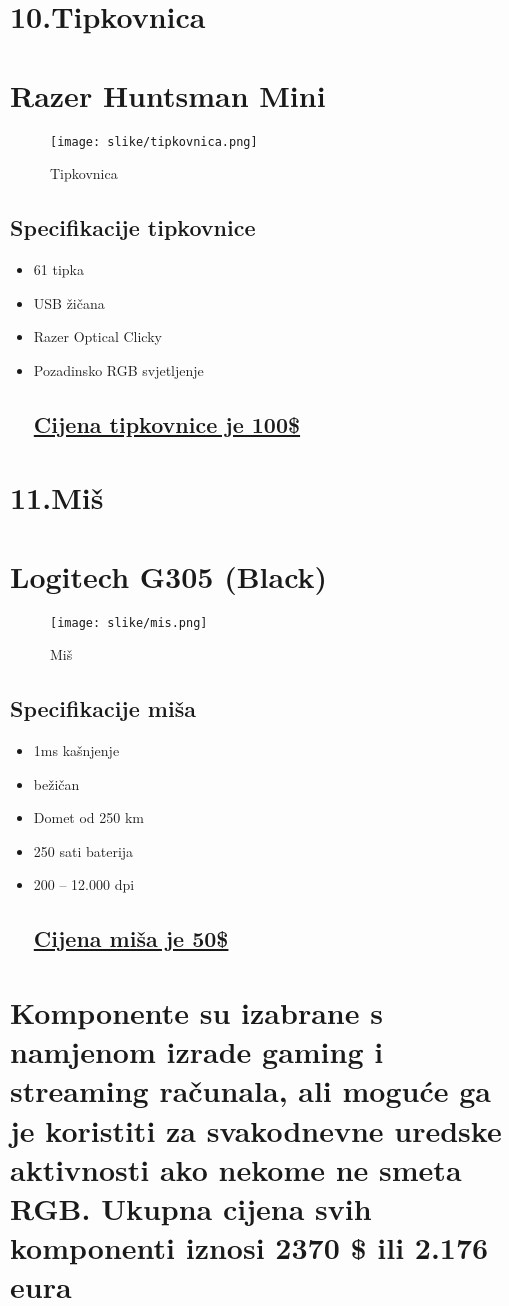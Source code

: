 \documentclass[12pt]{article}
\begin{document}
\newpage
\section*{\Huge 10.Tipkovnica}
\section*{\large Razer Huntsman Mini}
\begin{figure}[h]
    \centering
    \texttt{[image: slike/tipkovnica.png]} 
    \caption{Tipkovnica}
\end{figure}
\subsection*{Specifikacije tipkovnice}
\begin{itemize}[label=--, left=0em]
    \item 61 tipka
    \item USB žičana
    \item Razer Optical Clicky
    \item Pozadinsko RGB svjetljenje
\subsection*{\href{https://www.amazon.com/dp/B08B3CFL6W}{Cijena tipkovnice je 100\$}}
\end{itemize}

\newpage
\section*{\Huge 11.Miš}
\section*{\large Logitech G305 (Black)}
\begin{figure}[h]
    \centering
    \texttt{[image: slike/mis.png]} 
    \caption{Miš}
\end{figure}
\subsection*{Specifikacije miša}
\begin{itemize}[label=--, left=0em]
    \item 1ms kašnjenje
    \item bežičan
    \item Domet od 250 km
    \item 250 sati baterija
    \item 200 – 12.000 dpi
\subsection*{\href{https://www.amazon.com/dp/B07CMS5Q6P}{Cijena miša je 50\$}}
\end{itemize}

\newpage
\section*{Komponente su izabrane s namjenom izrade gaming i streaming računala, ali moguće ga je koristiti za svakodnevne uredske aktivnosti ako nekome ne smeta RGB. Ukupna cijena svih komponenti iznosi 2370 \$ ili 2.176 eura}
\end{document}
